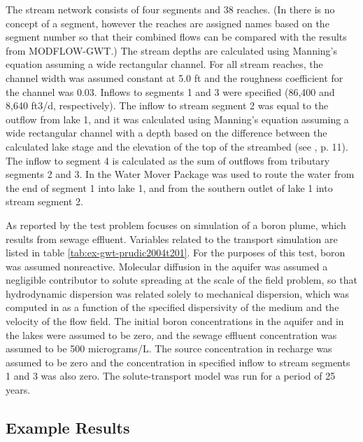 The stream network consists of four segments and 38 reaches. (In \mf there is no concept of a segment, however the reaches are assigned names based on the segment number so that their combined flows can be compared with the results from MODFLOW-GWT.) The stream depths are calculated using Manning’s equation assuming a wide rectangular channel. For all stream reaches, the channel width was assumed constant at 5.0 ft and the roughness coefficient for the channel was 0.03.  Inflows to segments 1 and 3 were specified (86,400 and 8,640 ft3/d, respectively). The inflow to stream segment 2 was equal to the outflow from lake 1, and it was calculated using Manning’s equation assuming a wide rectangular channel with a depth based on the difference between the calculated lake stage and the elevation of the top of the streambed (see \cite{modflowlak3pack}, p. 11). The inflow to segment 4 is calculated as the sum of outflows from tributary segments 2 and 3.  In \mf the Water Mover Package was used to route the water from the end of segment 1 into lake 1, and from the southern outlet of lake 1 into stream segment 2.  

As reported by \cite{modflowsfr1pack} the test problem focuses on simulation of a boron plume, which results from sewage effluent.  Variables related to the transport simulation are listed in table \ref{tab:ex-gwt-prudic2004t201}.  For the purposes of this test, boron was assumed nonreactive. Molecular diffusion in the aquifer was assumed a negligible contributor to solute spreading at the scale of the field problem, so that hydrodynamic dispersion was related solely to mechanical dispersion, which was computed in \mf as a function of the specified dispersivity of the medium and the velocity of the flow field. The initial boron concentrations in the aquifer and in the lakes were assumed to be zero, and the sewage effluent concentration was assumed to be 500 micrograms/L. The source concentration in recharge was assumed to be zero and the concentration in specified inflow to stream segments 1 and 3 was also zero. The solute-transport model was run for a period of 25 years.


\subsection{Example Results}

